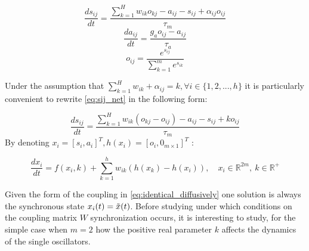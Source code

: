 \begin{equation}
    \frac{ds_{ij}}{dt} = \frac{\sum\limits_{k=1}^H w_{ik}o_{kj}-a_{ij}-s_{ij} + \alpha_{ij} o_{ij}}{\tau_m} 
    \label{eq:sij_net}
\end{equation}
\begin{equation}
    \frac{da_{ij}}{dt} = \frac{g_ao_{ij}-a_{ij}}{\tau_a} 
    \label{eq:aij_net}
\end{equation}
\begin{equation}
    o_{ij} = \frac{e^{s_{ij}}}{ \sum\limits_{k=1}^m e^{s_{ik}}}
    \label{eq:oij_net}
\end{equation}

Under the assumption that $\sum\limits_{k=1}^H w_{ik} + \alpha_{ij}=k, \forall i \in \{1, 2, ..., h\}$  it is particularly convenient to rewrite \cref{eq:sij_net} in the following form:

\begin{equation}
    \frac{ds_{ij}}{dt} = \frac{\sum\limits_{k=1}^H w_{ik}(o_{kj}-o_{ij})-a_{ij}-s_{ij} + k o_{ij}}{\tau_m} 
    \label{eq:sij_net_nice}
\end{equation}
By denoting $x_i=[s_i, a_i]^{T}, h(x_i)=[o_i, 0_{m \times 1}]^T$ :

\begin{equation}
    \frac{dx_i}{dt} = f(x_i,k) + \sum\limits_{k=1}^h w_{ik}(h(x_k)-h(x_i)),\quad x_i \in \mathbb{R}^{2m},\ k \in \mathbb{R}^+
    \label{eq:identical_diffusively}
\end{equation}

Given the form of the coupling in \cref{eq:identical_diffusively} one solution is always the synchronous state $x_i(t)=\Tilde{x}(t)$. Before studying under which conditions on the coupling matrix $W$ synchronization occurs, it is interesting to study, for the simple case when $m=2$ how the positive real parameter $k$ affects the dynamics of the single oscillators.

